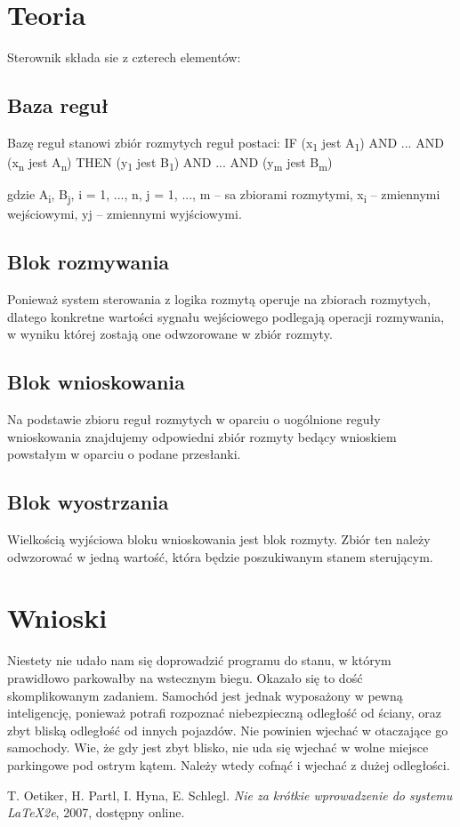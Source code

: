 \documentclass{classrep}
\begin{document}
\clearpage
\section{Teoria}
Sterownik składa sie z czterech elementów:
\subsection{Baza reguł}
Bazę reguł stanowi zbiór rozmytych reguł postaci:
IF (x\textsubscript{1} jest A\textsubscript{1}) AND ... AND (x\textsubscript{n} jest A\textsubscript{n})
THEN (y\textsubscript{1} jest B\textsubscript{1}) AND ... AND (y\textsubscript{m} jest B\textsubscript{m})

gdzie A\textsubscript{i}, B\textsubscript{j}, i = 1, ..., n, j = 1, ..., m – sa zbiorami rozmytymi, x\textsubscript{i} –
zmiennymi wejściowymi, yj – zmiennymi wyjściowymi.

\subsection{Blok rozmywania}
Ponieważ system sterowania z logika rozmytą operuje na zbiorach rozmytych,
dlatego konkretne wartości sygnału wejściowego podlegają operacji
rozmywania, w wyniku której zostają one odwzorowane w zbiór rozmyty.
\subsection{Blok wnioskowania}
Na podstawie zbioru reguł rozmytych w oparciu o uogólnione reguły
wnioskowania znajdujemy odpowiedni zbiór rozmyty bedący wnioskiem
powstałym w oparciu o podane przesłanki.
\subsection{Blok wyostrzania}
Wielkością wyjściowa bloku wnioskowania jest blok rozmyty. Zbiór ten
należy odwzorować w jedną wartość, która będzie poszukiwanym stanem
sterującym.

\clearpage

\section{Wnioski}
  Niestety nie udało nam się doprowadzić programu do stanu, w którym prawidłowo parkowałby na wstecznym biegu. Okazało się to dość skomplikowanym zadaniem. Samochód jest jednak wyposażony w pewną inteligencję, ponieważ potrafi rozpoznać niebezpieczną odległość od ściany, oraz zbyt bliską odległość od innych pojazdów. Nie powinien wjechać w otaczające go samochody. Wie, że gdy jest zbyt blisko, nie uda się wjechać w wolne miejsce parkingowe pod ostrym kątem. Należy wtedy cofnąć i wjechać z dużej odległości.



\begin{thebibliography}{0}
   T. Oetiker, H. Partl, I. Hyna, E. Schlegl.
    \textsl{Nie za krótkie wprowadzenie do systemu \LaTeX2e}, 2007, dostępny
    online.
\end{thebibliography}
\end{document}
